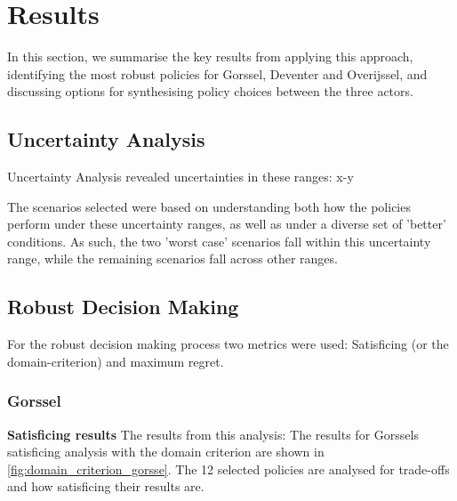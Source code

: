 \section{Results}
\label{s:results}

In this section, we summarise the key results from applying this approach, identifying the most robust policies for Gorssel, Deventer and Overijssel, and discussing options for synthesising policy choices between the three actors.


\subsection{Uncertainty Analysis}
Uncertainty Analysis revealed uncertainties in these ranges: x-y

The scenarios selected were based on understanding both how the policies perform under these uncertainty ranges, as well as under a diverse set of 'better' conditions. As such, the two 'worst case' scenarios fall within this uncertainty range, while the remaining scenarios fall across other ranges.


\subsection{Robust Decision Making}
For the robust decision making process two metrics were used: Satisficing (or the domain-criterion) and maximum regret. 
\subsubsection{Gorssel}
\textbf{Satisficing results} \newline
The results from this analysis: The results for Gorssels satisficing analysis with the domain criterion are shown in \autoref{fig:domain_criterion_gorsse}. The 12 selected policies are analysed for trade-offs and how satisficing their results are. 

